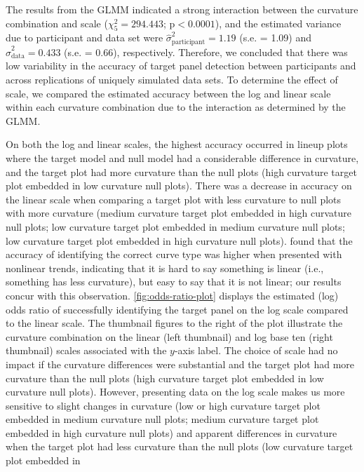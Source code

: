 \documentclass[12pt]{article}
\begin{document}
The results from the GLMM indicated a strong interaction between the
curvature combination and scale (\(\chi^2_5 = 294.443\);
\(\text{p} <0.0001\)), and the estimated variance due to participant and
data set were \(\hat\sigma^2_{\text{participant}} = 1.19\) (s.e. = 1.09)
and \(\hat\sigma^2_{\text{data}} = 0.433\) (s.e. = 0.66), respectively.
Therefore, we concluded that there was low variability in the accuracy
of target panel detection between participants and across replications
of uniquely simulated data sets. To determine the effect of scale, we
compared the estimated accuracy between the log and linear scale within
each curvature combination due to the interaction as determined by the
GLMM.

On both the log and linear scales, the highest accuracy occurred in
lineup plots where the target model and null model had a considerable
difference in curvature, and the target plot had more curvature than the
null plots (high curvature target plot embedded in low curvature null
plots). There was a decrease in accuracy on the linear scale when
comparing a target plot with less curvature to null plots with more
curvature (medium curvature target plot embedded in high curvature null
plots; low curvature target plot embedded in medium curvature null
plots; low curvature target plot embedded in high curvature null plots).
\citet{best_perception_2007} found that the accuracy of identifying the
correct curve type was higher when presented with nonlinear trends,
indicating that it is hard to say something is linear (i.e., something
has less curvature), but easy to say that it is not linear; our results
concur with this observation. \cref{fig:odds-ratio-plot} displays the
estimated (log) odds ratio of successfully identifying the target panel
on the log scale compared to the linear scale. The thumbnail figures to
the right of the plot illustrate the curvature combination on the linear
(left thumbnail) and log base ten (right thumbnail) scales associated
with the \(y\)-axis label. The choice of scale had no impact if the
curvature differences were substantial and the target plot had more
curvature than the null plots (high curvature target plot embedded in
low curvature null plots). However, presenting data on the log scale
makes us more sensitive to slight changes in curvature (low or high
curvature target plot embedded in medium curvature null plots; medium
curvature target plot embedded in high curvature null plots) and
apparent differences in curvature when the target plot had less
curvature than the null plots (low curvature target plot embedded in
\end{document}
